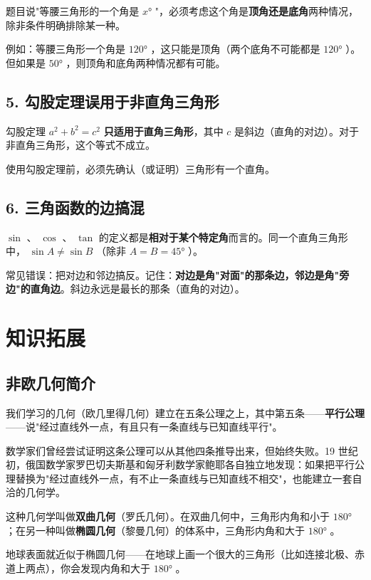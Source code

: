 题目说"等腰三角形的一个角是 $x°$ "，必须考虑这个角是\textbf{顶角还是底角}两种情况，除非条件明确排除某一种。

例如：等腰三角形一个角是 $120°$ ，这只能是顶角（两个底角不可能都是 $120°$ ）。但如果是 $50°$ ，则顶角和底角两种情况都有可能。

\subsection*{5. 勾股定理误用于非直角三角形}


勾股定理 $a^2 + b^2 = c^2$ \textbf{只适用于直角三角形}，其中 $c$ 是斜边（直角的对边）。对于非直角三角形，这个等式不成立。

使用勾股定理前，必须先确认（或证明）三角形有一个直角。

\subsection*{6. 三角函数的边搞混}


$\sin$ 、 $\cos$ 、 $\tan$ 的定义都是\textbf{相对于某个特定角}而言的。同一个直角三角形中， $\sin A \neq \sin B$ （除非 $A = B = 45°$ ）。

常见错误：把对边和邻边搞反。记住：\textbf{对边是角"对面"的那条边，邻边是角"旁边"的直角边}。斜边永远是最长的那条（直角的对边）。



\section*{知识拓展}


\subsection*{非欧几何简介}


我们学习的几何（欧几里得几何）建立在五条公理之上，其中第五条——\textbf{平行公理}——说"经过直线外一点，有且只有一条直线与已知直线平行"。

数学家们曾经尝试证明这条公理可以从其他四条推导出来，但始终失败。19 世纪初，俄国数学家罗巴切夫斯基和匈牙利数学家鲍耶各自独立地发现：如果把平行公理替换为"经过直线外一点，有不止一条直线与已知直线不相交"，也能建立一套自洽的几何学。

这种几何学叫做\textbf{双曲几何}（罗氏几何）。在双曲几何中，三角形内角和小于 $180°$ ；在另一种叫做\textbf{椭圆几何}（黎曼几何）的体系中，三角形内角和大于 $180°$ 。

地球表面就近似于椭圆几何——在地球上画一个很大的三角形（比如连接北极、赤道上两点），你会发现内角和大于 $180°$ 。

